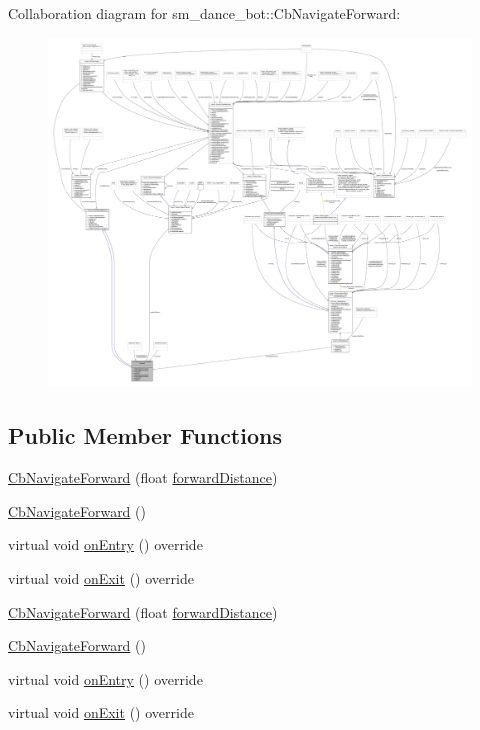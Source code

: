 Collaboration diagram for sm\+\_\+dance\+\_\+bot\+:\+:Cb\+Navigate\+Forward\+:
\nopagebreak
\begin{figure}[H]
\begin{center}
\leavevmode
\includegraphics[width=350pt]{classsm__dance__bot_1_1CbNavigateForward__coll__graph}
\end{center}
\end{figure}
\subsection*{Public Member Functions}
\begin{DoxyCompactItemize}
\item 
\hyperlink{classsm__dance__bot_1_1CbNavigateForward_a36295d9123b7a8d60a97eb75cc21e342}{Cb\+Navigate\+Forward} (float \hyperlink{classsm__dance__bot_1_1CbNavigateForward_af150b8fb72f2a27b6fef85b6f169b91b}{forward\+Distance})
\item 
\hyperlink{classsm__dance__bot_1_1CbNavigateForward_a3bc7ae2a24f356af43f43743154425a7}{Cb\+Navigate\+Forward} ()
\item 
virtual void \hyperlink{classsm__dance__bot_1_1CbNavigateForward_a8dd85c804a3d69587d0d6b7a1c4bc6a3}{on\+Entry} () override
\item 
virtual void \hyperlink{classsm__dance__bot_1_1CbNavigateForward_abd291ba77cd42537324eb9fbfc44cd22}{on\+Exit} () override
\item 
\hyperlink{classsm__dance__bot_1_1CbNavigateForward_a36295d9123b7a8d60a97eb75cc21e342}{Cb\+Navigate\+Forward} (float \hyperlink{classsm__dance__bot_1_1CbNavigateForward_af150b8fb72f2a27b6fef85b6f169b91b}{forward\+Distance})
\item 
\hyperlink{classsm__dance__bot_1_1CbNavigateForward_a3bc7ae2a24f356af43f43743154425a7}{Cb\+Navigate\+Forward} ()
\item 
virtual void \hyperlink{classsm__dance__bot_1_1CbNavigateForward_a8dd85c804a3d69587d0d6b7a1c4bc6a3}{on\+Entry} () override
\item 
virtual void \hyperlink{classsm__dance__bot_1_1CbNavigateForward_abd291ba77cd42537324eb9fbfc44cd22}{on\+Exit} () override
\end{DoxyCompactItemize}
